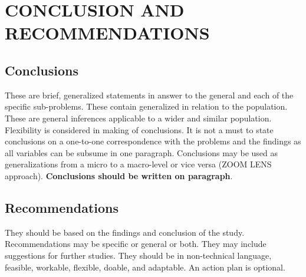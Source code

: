 \chapter{CONCLUSION AND RECOMMENDATIONS}

\section{Conclusions}
These are brief, generalized statements in answer to the general and each of the specific sub-problems. These contain generalized in relation to the population. These are general inferences applicable to a wider and similar population. Flexibility is considered in making of conclusions. It is not a must to state conclusions on a one-to-one correspondence with the problems and the findings as all variables can be subsume in one paragraph. Conclusions may be used as generalizations from a micro to a macro-level or vice versa (ZOOM LENS approach). \textbf{Conclusions should be written on paragraph}.

\section{Recommendations}
They should be based on the findings and conclusion of the study. Recommendations may be specific or general or both. They may include suggestions for further studies. They should be in non-technical language, feasible, workable, flexible, doable, and adaptable. An action plan is optional.
